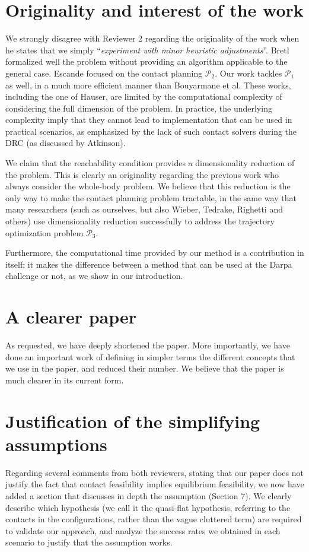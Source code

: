\documentclass[a4paper]{article}
\begin{document}
\section{Originality and interest of the work}
We strongly disagree with Reviewer 2 regarding the originality of the work when he states that we simply ``\textit{experiment with minor heuristic adjustments}''.
Bretl formalized well the problem without providing an algorithm applicable to the general case. Escande focused on the contact planning $\mathcal{P}_2$. 
Our work tackles $\mathcal{P}_1$ as well, in a much more efficient manner than Bouyarmane et al.
These works, including the one of Hauser, are limited by the computational complexity of considering the full dimension of the problem.
In practice, the underlying complexity imply that they cannot lead to implementation that can be used in practical scenarios, as emphasized by the lack of such contact solvers during the DRC (as discussed by Atkinson).

We claim that the reachability condition provides a dimensionality reduction of the problem. This is clearly an originality regarding the previous work who always consider the whole-body problem.
We believe that this reduction is the only way to make the contact planning problem tractable, in the same way that many researchers (such as ourselves, but also Wieber, Tedrake, Righetti and others) use dimensionality reduction successfully to address the trajectory optimization problem $\mathcal{P}_3$.

Furthermore, the computational time provided by our method is a contribution in itself: it makes the difference
between a method that can be used at the Darpa challenge or not, as we show in our introduction.

\section{A clearer paper}
As requested, we have deeply shortened the paper. More importantly, we have done an important work of defining in simpler terms
the different concepts that we use in the paper, and reduced their number.
We believe that the paper is much clearer in its current form.

\section{Justification of the simplifying assumptions}
Regarding several comments from both reviewers, stating that our paper does not justify the fact that contact feasibility implies equilibrium feasibility,
we now have added a section that discusses in depth the assumption (Section 7). We clearly describe which hypothesis (we call it the quasi-flat hypothesis, referring
to the contacts in the configurations, rather than the vague cluttered term) are required to validate our approach, and analyze
the success rates we obtained in each scenario to justify that the assumption works.
\end{document}
